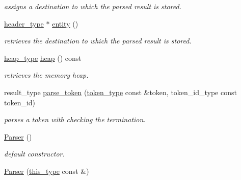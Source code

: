 \begin{DoxyCompactItemize}
\begin{DoxyCompactList}\small\item\em assigns a destination to which the parsed result is stored. \end{DoxyCompactList}\item 
\hypertarget{classhryky_1_1http_1_1header_1_1_parser_a141af3e67b7df44941b5cf2536ecce6b}{\hyperlink{classhryky_1_1http_1_1header_1_1_entity}{header\-\_\-type} $\ast$ \hyperlink{classhryky_1_1http_1_1header_1_1_parser_a141af3e67b7df44941b5cf2536ecce6b}{entity} ()}\label{classhryky_1_1http_1_1header_1_1_parser_a141af3e67b7df44941b5cf2536ecce6b}

\begin{DoxyCompactList}\small\item\em retrieves the destination to which the parsed result is stored. \end{DoxyCompactList}\item 
\hypertarget{classhryky_1_1parser_1_1_base_ade0723cedb648d9850423cc04fe4bdcf}{\hyperlink{classhryky_1_1memory_1_1heap_1_1_base}{heap\-\_\-type} \hyperlink{classhryky_1_1parser_1_1_base_ade0723cedb648d9850423cc04fe4bdcf}{heap} () const}\label{classhryky_1_1parser_1_1_base_ade0723cedb648d9850423cc04fe4bdcf}

\begin{DoxyCompactList}\small\item\em retrieves the memory heap. \end{DoxyCompactList}\item 
\hypertarget{classhryky_1_1http_1_1header_1_1_parser_ac5cb77a42333648c7e8229fdece7b052}{result\-\_\-type \hyperlink{classhryky_1_1http_1_1header_1_1_parser_ac5cb77a42333648c7e8229fdece7b052}{parse\-\_\-token} (\hyperlink{classhryky_1_1_vector}{token\-\_\-type} const \&token, token\-\_\-id\-\_\-type const token\-\_\-id)}\label{classhryky_1_1http_1_1header_1_1_parser_ac5cb77a42333648c7e8229fdece7b052}

\begin{DoxyCompactList}\small\item\em parses a token with checking the termination. \end{DoxyCompactList}\item 
\hypertarget{classhryky_1_1http_1_1header_1_1_parser_a3e9805064f5a4c2d6877ad0c492a6d4b}{\hyperlink{classhryky_1_1http_1_1header_1_1_parser_a3e9805064f5a4c2d6877ad0c492a6d4b}{Parser} ()}\label{classhryky_1_1http_1_1header_1_1_parser_a3e9805064f5a4c2d6877ad0c492a6d4b}

\begin{DoxyCompactList}\small\item\em default constructor. \end{DoxyCompactList}\item 
\hypertarget{classhryky_1_1http_1_1header_1_1_parser_a7c8a6e94f32eb350286dfdde5ad6d01f}{\hyperlink{classhryky_1_1http_1_1header_1_1_parser_a7c8a6e94f32eb350286dfdde5ad6d01f}{Parser} (\hyperlink{classhryky_1_1http_1_1header_1_1_parser_aed496466ed39c1bcf709a3be673f3478}{this\-\_\-type} const \&)}\label{classhryky_1_1http_1_1header_1_1_parser_a7c8a6e94f32eb350286dfdde5ad6d01f}


\end{DoxyCompactItemize}
